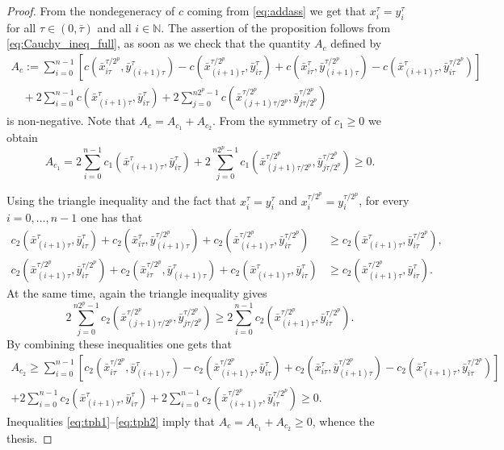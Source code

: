 \documentclass[10pt,a4paper]{amsart}
\newcommand{\N}{\mathbb{N}}
\begin{document}
\begin{proof}  From the nondegeneracy of $c$  coming from \eqref{eq:addass}  we get that $x_i^\tau=y_i^\tau$ for all $\tau \in (0,\bar{\tau})$ and all $i \in \N$. 
The assertion of the proposition follows from \eqref{eq:Cauchy_ineq_full}, as soon as we check that the quantity $A_c$  defined by 
\begin{multline}
    A_c:= \sum_{i=0}^{n-1}[c(\bar{x}_{i\tau}^{\tau/2^p},\bar{y}_{(i+1)\tau}^\tau)- c(\bar{x}_{(i+1)\tau}^{\tau/2^p},\bar{y}_{i\tau}^\tau) + c(\bar{x}_{i\tau}^\tau,\bar{y}_{(i+1)\tau}^{\tau/2^p})-c(\bar{x}_{(i+1)\tau}^\tau,\bar{y}_{i\tau}^{\tau/2^p})]\\
   \quad +2\sum_{i=0}^{n-1}c(\bar{x}_{(i+1)\tau}^\tau, \bar{y}_{i\tau}^\tau)+ 2\sum_{j=0}^{n2^p-1}c(\bar{x}_{(j+1)\tau/2^p}^{\tau/2^p}, \bar{y}_{j\tau/2^p}^{\tau/2^p})\label{eq:tph0}
\end{multline}
 is non-negative. 
Note that $A_c=A_{c_1}+A_{c_2}$. From the symmetry of $c_1\geq 0$ we obtain 
\begin{equation}
      A_{c_1}=2\sum_{i=0}^{n-1}c_1(\bar{x}_{(i+1)\tau}^\tau, \bar{y}_{i\tau}^\tau)+ 2\sum_{j=0}^{n2^p-1}c_1(\bar{x}_{(j+1)\tau/2^p}^{\tau/2^p}, \bar{y}_{j\tau/2^p}^{\tau/2^p}) \ge 0.\label{eq:tph1}
\end{equation}

Using the triangle inequality and the fact that $x_i^\tau = y_i^\tau $ and $x_i^{\tau/2^p} = y_i^{\tau/2^p} $, for  every $i=0, \dots, n-1$ one has that 
\begin{align*}
   c_2(\bar{x}_{(i+1)\tau}^\tau, \bar y_{i\tau}^\tau)+ c_2(\bar x_{i\tau}^\tau,\bar y_{(i+1)\tau}^{\tau/2^p})+c_2(\bar x_{(i+1)\tau}^{\tau/2^p}, \bar y_{i\tau}^{\tau/2^p}) &\ge c_2(\bar x_{(i+1)\tau}^\tau,\bar y_{i\tau}^{\tau/2^p}),\\
   c_2(\bar x_{(i+1)\tau}^{\tau/2^p}, \bar y_{i\tau}^{\tau/2^p})+c_2(\bar x_{i\tau}^{\tau/2^p},\bar y_{(i+1)\tau}^\tau) + c_2(\bar x_{(i+1)\tau}^\tau, \bar y_{i\tau}^\tau) &\ge c_2(\bar x_{(i+1)\tau}^{\tau/2^p},\bar y_{i\tau}^\tau).
\end{align*}
At the same time, again the triangle inequality gives 
\begin{equation*}
    2  \sum_{j=0}^{n2^p-1}c_2(\bar x_{(j+1)\tau/2^p}^{\tau/2^p}, \bar y_{j\tau/2^p}^{\tau/2^p}) \ge   2  \sum_{i=0}^{n-1}c_2(\bar x_{(i+1)\tau}^{\tau/2^p}, \bar y_{i\tau}^{\tau/2^p}).
\end{equation*}
By combining these inequalities one gets that 
\begin{multline}
   A_{c_2}\geq 
   \sum_{i=0}^{n-1}[c_2(\bar{x}_{i\tau}^{\tau/2^p},\bar{y}_{(i+1)\tau}^\tau)- c_2(\bar{x}_{(i+1)\tau}^{\tau/2^p},\bar{y}_{i\tau}^\tau) + c_2(\bar{x}_{i\tau}^\tau,\bar{y}_{(i+1)\tau}^{\tau/2^p})-c_2(\bar{x}_{(i+1)\tau}^\tau,\bar{y}_{i\tau}^{\tau/2^p})]\\
   +2\sum_{i=0}^{n-1}c_2(\bar{x}_{(i+1)\tau}^\tau, \bar{y}_{i\tau}^\tau)+ 2\sum_{i=0}^{n-1}c_2(\bar x_{(i+1)\tau}^{\tau/2^p}, \bar y_{i\tau}^{\tau/2^p}) \geq 0. 
   \label{eq:tph2}
\end{multline}
Inequalities \eqref{eq:tph1}--\eqref{eq:tph2} imply  that $A_c = A_{c_1} + A_{c_2} \geq 0$,  whence the thesis. 
\end{proof}
\end{document}
